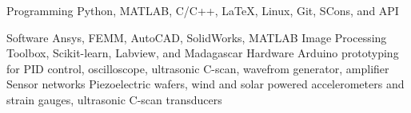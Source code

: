 

\begin{cvskillsv}

  \cvskillv
    {Programming} %
    {Python, MATLAB, C/C++, LaTeX, Linux, Git, SCons, and API} %
    
  \cvskill
    {Software} %
    {Ansys, FEMM, AutoCAD, SolidWorks, MATLAB Image Processing Toolbox, Scikit-learn, Labview, and Madagascar} %
  \cvskill
    {Hardware} %
    {Arduino prototyping for PID control, oscilloscope, ultrasonic C-scan, wavefrom generator, amplifier} %
  \cvskill
    {Sensor networks} %
    {Piezoelectric wafers, wind and solar powered accelerometers and strain gauges, ultrasonic C-scan transducers} %
     


\end{cvskillsv}
